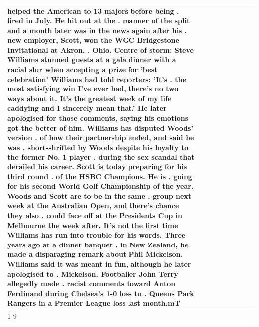 \begin{table}[H]
\begin{tabular}{lllrlllll}
helped the American to 13 majors before being . fired in July. He hit out at the . manner of the split and a month later was in the news again after his . new employer, Scott, won the WGC Bridgestone Invitational at Akron, . Ohio. Centre of storm: Steve Williams stunned guests at a gala dinner with a racial slur when accepting a prize for 'best celebration' Williams had told reporters: 'It's . the most satisfying win I've ever had, there's no two ways about it. It's the greatest week of my life caddying and I sincerely mean that.' He later apologised for those comments, saying his emotions got the better of him. Williams has disputed Woods' version . of how their partnership ended, and said he was . short-shrifted by Woods despite his loyalty to the former No. 1 player . during the sex scandal that derailed his career. Scott is today preparing for his third round . of the HSBC Champions. He is . going for his second World Golf Championship of the year. Woods and Scott are to be in the same . group next week at the Australian Open, and there's chance they also . could face off at the Presidents Cup in Melbourne the week after. It's not the first time Williams has run into trouble for his words. Three years ago at a dinner banquet . in New Zealand, he made a disparaging remark about Phil Mickelson. Williams said it was meant in fun, although he later apologised to . Mickelson. Footballer John Terry allegedly made . racist comments toward Anton Ferdinand during Chelsea's 1-0 loss to . Queens Park Rangers in a Premier League loss last month.mT \\
\cline{1-9}

\end{tabular}
\end{table}

